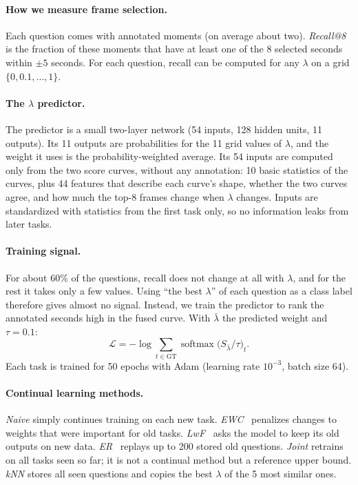 \documentclass[10pt,twocolumn,letterpaper]{article}
\newcommand{\lam}{\lambda}
\begin{document}
\paragraph{How we measure frame selection.}
Each question comes with annotated moments (on average about two).
\emph{Recall@8} is the fraction of these moments that have at least one of the 8 selected seconds within $\pm5$ seconds.
For each question, recall can be computed for any $\lam$ on a grid $\{0, 0.1, \dots, 1\}$.

\paragraph{The $\lam$ predictor.}
The predictor is a small two-layer network (54 inputs, 128 hidden units, 11 outputs).
Its 11 outputs are probabilities for the 11 grid values of $\lam$, and the weight it uses is the probability-weighted average.
Its 54 inputs are computed only from the two score curves, without any annotation:
10 basic statistics of the curves, plus 44 features that describe each curve's shape, whether the two curves agree, and how much the top-8 frames change when $\lam$ changes.
Inputs are standardized with statistics from the first task only, so no information leaks from later tasks.

\paragraph{Training signal.}
For about 60\% of the questions, recall does not change at all with $\lam$, and for the rest it takes only a few values.
Using ``the best $\lam$'' of each question as a class label therefore gives almost no signal.
Instead, we train the predictor to rank the annotated seconds high in the fused curve.
With $\bar\lam$ the predicted weight and $\tau=0.1$:
\begin{equation}
  \mathcal{L} = -\log \sum_{t\in\text{GT}} \operatorname{softmax}\!\big(S_{\bar\lam}/\tau\big)_t .
\end{equation}
Each task is trained for 50 epochs with Adam (learning rate $10^{-3}$, batch size 64).

\paragraph{Continual learning methods.}
\emph{Naive} simply continues training on each new task.
\emph{EWC}~\cite{kirkpatrick2017ewc} penalizes changes to weights that were important for old tasks.
\emph{LwF}~\cite{li2016lwf} asks the model to keep its old outputs on new data.
\emph{ER}~\cite{chaudhry2019tiny} replays up to 200 stored old questions.
\emph{Joint} retrains on all tasks seen so far; it is not a continual method but a reference upper bound.
\emph{kNN} stores all seen questions and copies the best $\lam$ of the 5 most similar ones.
\end{document}
